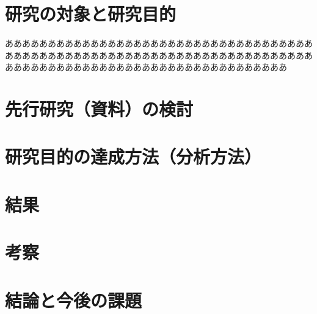 \documentclass[a4paper, report, fontsize=9pt]{jlreq}
\begin{document}
\chapter{研究の対象と研究目的}
あああああああああああああああああああああああああああああああああああああああああああああああああああああああああああああああああああああああああああああああああああああああああああああああああああああああああ

\chapter{先行研究（資料）の検討}
\chapter{研究目的の達成方法（分析方法）}
\chapter{結果}
\chapter{考察}
\chapter{結論と今後の課題}
\end{document}
